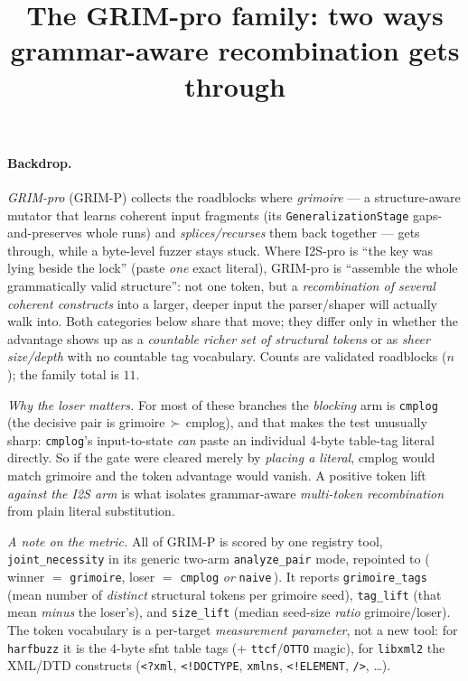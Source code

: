 \documentclass[11pt]{article}
\title{\textbf{The GRIM-pro family: two ways grammar-aware recombination gets through}}
\author{}
\date{}
\begin{document}
\maketitle
\vspace{-3em}

\paragraph{Backdrop.} \emph{GRIM-pro} (GRIM-P) collects the roadblocks where
\emph{grimoire} --- a structure-aware mutator that learns coherent input
fragments (its \texttt{GeneralizationStage} gaps-and-preserves whole runs) and
\emph{splices/recurses} them back together --- gets through, while a byte-level
fuzzer stays stuck. Where I2S-pro is ``the key was lying beside the lock''
(paste \emph{one} exact literal), GRIM-pro is ``assemble the whole grammatically
valid structure'': not one token, but a \emph{recombination of several coherent
constructs} into a larger, deeper input the parser/shaper will actually walk
into. Both categories below share that move; they differ only in whether the
advantage shows up as a \emph{countable richer set of structural tokens} or as
\emph{sheer size/depth} with no countable tag vocabulary. Counts are validated
roadblocks ($n$); the family total is $11$.

\smallskip\noindent\textit{Why the loser matters.} For most of these branches the
\emph{blocking} arm is \texttt{cmplog} (the decisive pair is
\mbox{grimoire\,$\succ$\,cmplog}), and that makes the test unusually sharp:
\texttt{cmplog}'s input-to-state \emph{can} paste an individual 4-byte table-tag
literal directly. So if the gate were cleared merely by \emph{placing a literal},
cmplog would match grimoire and the token advantage would vanish. A positive
token lift \emph{against the I2S arm} is what isolates grammar-aware
\emph{multi-token recombination} from plain literal substitution.

\smallskip\noindent\textit{A note on the metric.} All of GRIM-P is scored by one
registry tool, \texttt{joint\_necessity} in its generic two-arm
\texttt{analyze\_pair} mode, repointed to (\,winner $=$ \texttt{grimoire},
loser $=$ \texttt{cmplog} \emph{or} \texttt{naive}\,). It reports
\texttt{grimoire\_tags} (mean number of \emph{distinct} structural tokens per
grimoire seed), \texttt{tag\_lift} (that mean \emph{minus} the loser's), and
\texttt{size\_lift} (median seed-size \emph{ratio} grimoire/loser). The token
vocabulary is a per-target \emph{measurement parameter}, not a new tool: for
\texttt{harfbuzz} it is the 4-byte sfnt table tags ($+$ \texttt{ttcf}/\texttt{OTTO}
magic), for \texttt{libxml2} the XML/DTD constructs (\texttt{<?xml},
\texttt{<!DOCTYPE}, \texttt{xmlns}, \texttt{<!ELEMENT}, \texttt{/>}, \ldots).
\end{document}
